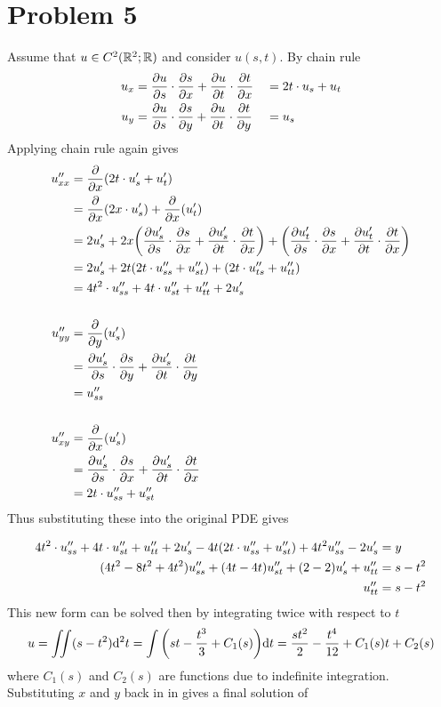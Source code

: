 \documentclass{eeleyes}
\begin{document}
\section*{Problem 5}
Assume that $u \in C^2(\mathbb{R}^2; \mathbb{R})$ and consider $u(s,t)$. By chain rule
\begin{alignat*}{3}
    u_x &= \pdv{u}{s} \cdot \pdv{s}{x} + \pdv{u}{t} \cdot \pdv{t}{x} &&= 2t \cdot u_s + u_t \\
    u_y &= \pdv{u}{s} \cdot \pdv{s}{y} + \pdv{u}{t} \cdot \pdv{t}{y} &&= u_s
\end{alignat*}
Applying chain rule again gives
{\allowdisplaybreaks
\begin{align*}
    u''_{xx} &= \pdv{x} (2t \cdot u'_s + u'_t)  \\
           &= \pdv{x} (2x \cdot u'_s) + \pdv{x} (u'_t) \\
           &= 2 u'_s + 2x \qty(\pdv{u'_s}{s} \cdot \pdv{s}{x} + \pdv{u'_s}{t} \cdot \pdv{t}{x}) + \qty(\pdv{u'_t}{s} \cdot \pdv{s}{x} + \pdv{u'_t}{t} \cdot \pdv{t}{x}) \\
           &= 2 u'_s + 2t \qty(2t \cdot u''_{ss} + u''_{st}) + \qty(2t \cdot u''_{ts} + u''_{tt}) \\
           &= 4t^2 \cdot u''_{ss} + 4t \cdot u''_{st} + u''_{tt} + 2 u'_s \\
           \\
    u''_{yy} &= \pdv{y} (u'_s) \\
           &= \pdv{u'_s}{s} \cdot \pdv{s}{y} + \pdv{u'_s}{t} \cdot \pdv{t}{y} \\
           &= u''_{ss} \\
           \\
    u''_{xy} &= \pdv{x} (u'_s) \\
           &= \pdv{u'_s}{s} \cdot \pdv{s}{x} + \pdv{u'_s}{t} \cdot \pdv{t}{x} \\
           &= 2t \cdot u''_{ss} + u''_{st}
\end{align*}}
Thus substituting these into the original PDE gives

\begin{align*}
    4t^2 \cdot u''_{ss} +4t \cdot u''_{st} + u''_{tt} + 2 u'_s - 4t \qty( 2t \cdot u''_{ss} + u''_{st}) + 4t^2 u''_{ss} - 2 u'_s &= y \\
    (4t^2 - 8t^2 + 4t^2) u''_{ss} + (4t - 4t) u''_{st} + (2 - 2) u'_s + u''_{tt} &= s - t^2 \\
                                                                        u''_{tt} &= s - t^2
\end{align*}
This new form can be solved then by integrating twice with respect to $t$
\[
    u = \iint (s-t^2) \dd^2 t = \int \qty(st - \frac{t^3}{3} + C_1(s)) \dd t = \frac{st^2}{2} - \frac{t^4}{12} + C_1(s) t + C_2(s)
\]
where $C_1(s)$ and $C_2(s)$ are functions due to indefinite integration. Substituting $x$ and $y$ back in in gives a final solution of
\end{document}
